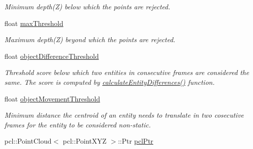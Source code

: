 \begin{DoxyCompactItemize}
\begin{DoxyCompactList}\small\item\em Minimum depth(\+Z) below which the points are rejected. \end{DoxyCompactList}\item 
\hypertarget{classpersonal_robotics_1_1_object_segmentor_a6c231e1c3a430d1df8da3684e9e9e56d}{}float \hyperlink{classpersonal_robotics_1_1_object_segmentor_a6c231e1c3a430d1df8da3684e9e9e56d}{max\+Threshold}\label{classpersonal_robotics_1_1_object_segmentor_a6c231e1c3a430d1df8da3684e9e9e56d}

\begin{DoxyCompactList}\small\item\em Maximum depth(\+Z) beyond which the points are rejected. \end{DoxyCompactList}\item 
\hypertarget{classpersonal_robotics_1_1_object_segmentor_a7c43b8387dd4c3c52fc8a99f6db827e4}{}float \hyperlink{classpersonal_robotics_1_1_object_segmentor_a7c43b8387dd4c3c52fc8a99f6db827e4}{object\+Difference\+Threshold}\label{classpersonal_robotics_1_1_object_segmentor_a7c43b8387dd4c3c52fc8a99f6db827e4}

\begin{DoxyCompactList}\small\item\em Threshold score below which two entities in consecutive frames are considered the same. The score is computed by \hyperlink{classpersonal_robotics_1_1_object_segmentor_a742bab296bfdbba8a449163dc7209180}{calculate\+Entity\+Differences()} function. \end{DoxyCompactList}\item 
\hypertarget{classpersonal_robotics_1_1_object_segmentor_a2cacaff215dc851445d3d111786e2c12}{}float \hyperlink{classpersonal_robotics_1_1_object_segmentor_a2cacaff215dc851445d3d111786e2c12}{object\+Movement\+Threshold}\label{classpersonal_robotics_1_1_object_segmentor_a2cacaff215dc851445d3d111786e2c12}

\begin{DoxyCompactList}\small\item\em Minimum distance the centroid of an entity needs to translate in two cosecutive frames for the entity to be considered non-\/static. \end{DoxyCompactList}\item 
\hypertarget{classpersonal_robotics_1_1_object_segmentor_afd8a8a0d82a7116b78142f4ef3fa3c49}{}pcl\+::\+Point\+Cloud$<$ pcl\+::\+Point\+X\+Y\+Z $>$\+::Ptr \hyperlink{classpersonal_robotics_1_1_object_segmentor_afd8a8a0d82a7116b78142f4ef3fa3c49}{pcl\+Ptr}\label{classpersonal_robotics_1_1_object_segmentor_afd8a8a0d82a7116b78142f4ef3fa3c49}


\end{DoxyCompactItemize}
